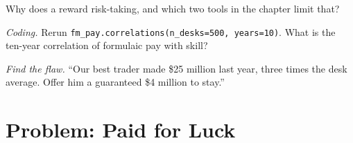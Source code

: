 \begin{exercise}[$\star\star$]\label{exo:fm:hiring-and-compensation:6}
Why does a  reward risk-taking, and which two tools in the chapter limit that?
\end{exercise}

\begin{exercise}[$\star\star\star$]\label{exo:fm:hiring-and-compensation:7}
\emph{Coding.} Rerun \texttt{fm\_pay.correlations(n\_desks=500, years=10)}. What is the ten-year correlation of formulaic pay with skill?
\end{exercise}

\begin{exercise}[$\star\star\star$]\label{exo:fm:hiring-and-compensation:8}
\emph{Find the flaw.} ``Our best trader made \$25 million last year, three times the desk average. Offer him a guaranteed \$4 million to stay.''
\end{exercise}

\section{Problem: Paid for Luck}

